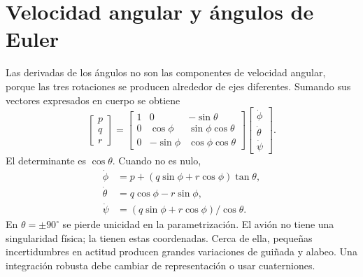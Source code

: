 
\section{Velocidad angular y ángulos de Euler}
Las derivadas de los ángulos no son las componentes de velocidad angular, porque las tres rotaciones se producen alrededor de ejes diferentes. Sumando sus vectores expresados en cuerpo se obtiene
\begin{equation}
\begin{bmatrix}p\\q\\r\end{bmatrix}=
\begin{bmatrix}1&0&-\sin\theta\\0&\cos\phi&\sin\phi\cos\theta\\0&-\sin\phi&\cos\phi\cos\theta\end{bmatrix}
\begin{bmatrix}\dot\phi\\\dot\theta\\\dot\psi\end{bmatrix}.
\label{eq:Euler-directa}
\end{equation}
El determinante es $\cos\theta$. Cuando no es nulo,
\begin{align}
\dot\phi&=p+(q\sin\phi+r\cos\phi)\tan\theta,\\
\dot\theta&=q\cos\phi-r\sin\phi,\\
\dot\psi&=(q\sin\phi+r\cos\phi)/\cos\theta.
\end{align}
En $\theta=\pm90^\circ$ se pierde unicidad en la parametrización. El avión no tiene una singularidad física; la tienen estas coordenadas. Cerca de ella, pequeñas incertidumbres en actitud producen grandes variaciones de guiñada y alabeo. Una integración robusta debe cambiar de representación o usar cuaterniones.

